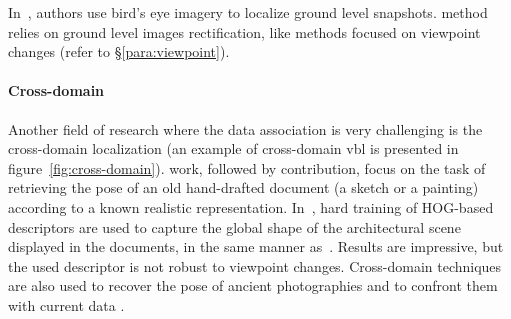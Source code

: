 			In~\citep{Bansal2011,Bansal2012,Lin2015}, authors use bird's eye imagery to localize ground level snapshots. \citet{Bansal2011} method relies on ground level images rectification, like methods focused on viewpoint changes (refer to \S\ref{para:viewpoint}).
			
		\paragraph{Cross-domain}
			\label{para:cross_domain}
			Another field of research where the data association is very challenging is the cross-domain localization (an example of cross-domain \ac{vbl} is presented in figure~\ref{fig:cross-domain}). \citet{Russell2011} work, followed by \citet{Aubry2014} contribution, focus on the task of retrieving the pose of an old hand-drafted document (a sketch or a painting) according to a known realistic representation. In~\citep{Aubry2014}, hard training of HOG-based descriptors are used to capture the global shape of the architectural scene displayed in the documents, in the same manner as~\citep{Shrivastava2011}. Results are impressive, but the used descriptor is not robust to viewpoint changes. Cross-domain techniques are also used to recover the pose of ancient photographies and to confront them with current data \citep{Bae2010,Bhowmik2017}.